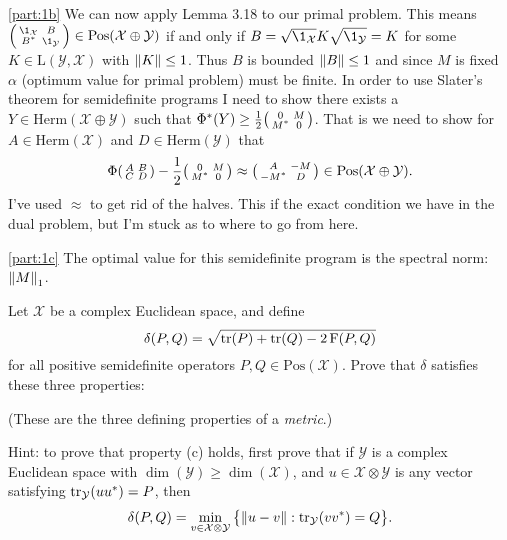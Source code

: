 \documentclass[boxes,pages,color=SeaGreen]{homework}
\newcommand{\X}{\mathcal{X}}
\newcommand{\Y}{\mathcal{Y}}
\newcommand{\Fid}{\operatorname{F}}
\newcommand{\Lin}{\mathrm{L}}
\newcommand{\Pos}{\mathrm{Pos}}
\newcommand{\Herm}{\mathrm{Herm}}
\begin{document}
\begin{solution}
    \ref{part:1b}
    We can now apply Lemma 3.18 to our primal problem.
    This means $\smqty(\1_\X & B \\ B^* & \1_\Y)\in\Pos(\X\oplus\Y)$ if and only if $B = \sqrt{\1_\X}K\sqrt{\1_\Y} = K$ for some $K\in\Lin(\Y,\X)$ with $\norm{K}\leq 1$.
    Thus $B$ is bounded $\norm{B} \leq 1$ and since $M$ is fixed $\alpha$ (optimum value for primal problem) must be finite.
    In order to use Slater's theorem for semidefinite programs I need to show there exists a $Y\in\Herm(\X\oplus\Y)$ such that $\Phi^*(Y) \geq \frac{1}{2}\smqty(0 & M \\ M^* & 0)$.
    That is we need to show for $A\in\Herm(\X)$ and $D\in\Herm(\Y)$ that
    \begin{equation*}
        \Phi\smqty(A & B \\ C & D) - \frac{1}{2}\smqty(0 & M \\ M^* & 0) \approx \smqty(A & - M \\ -M^* & D) \in \Pos(\X\oplus\Y).
    \end{equation*}
    I've used $\approx$ to get rid of the halves.
    This if the exact condition we have in the dual problem, but I'm stuck as to where to go from here.

    \ref{part:1c}
    The optimal value for this semidefinite program is the spectral norm: $\norm{M}_1$.
\end{solution}


\begin{problem}
Let $\X$ be a complex Euclidean space, and define
\[
    \delta(P,Q) = \sqrt{\tr(P) + \tr(Q) - 2 \Fid(P,Q)}
\]
for all positive semidefinite operators $P,Q\in\Pos(\X)$.
Prove that $\delta$ satisfies these three properties:
(These are the three defining properties of a \emph{metric}.)

Hint: to prove that property (c) holds, first prove that if
$\Y$ is a complex Euclidean space with $\dim(\Y)\geq\dim(\X)$,
and $u\in\X\otimes\Y$ is any vector satisfying $\tr_{\Y}(u u^{\ast}) = P$,
then
\[
    \delta(P,Q) = \min_{v\in\X\otimes\Y}\qty\big{\norm{u - v} : \tr_{\Y}(v v^*) = Q}.
\]
\end{problem}
\end{document}
